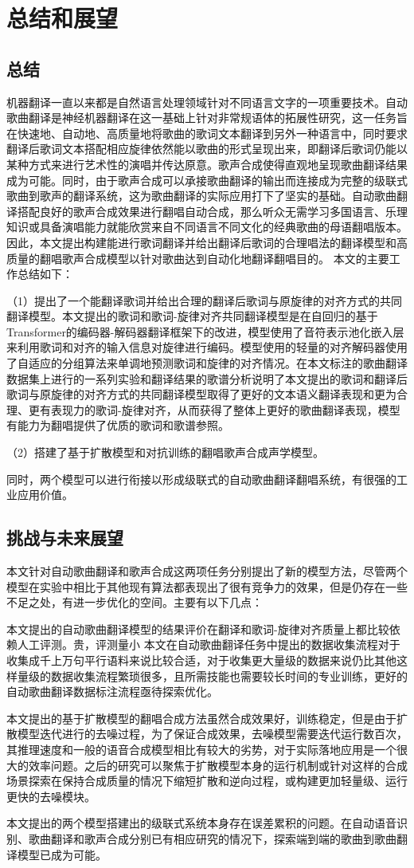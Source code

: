 



% 
\chapter{总结和展望}
\section{总结}
机器翻译一直以来都是自然语言处理领域针对不同语言文字的一项重要技术。自动歌曲翻译是神经机器翻译在这一基础上针对非常规语体的拓展性研究，这一任务旨在快速地、自动地、高质量地将歌曲的歌词文本翻译到另外一种语言中，同时要求翻译后歌词文本搭配相应旋律依然能以歌曲的形式呈现出来，即翻译后歌词仍能以某种方式来进行艺术性的演唱并传达原意。歌声合成使得直观地呈现歌曲翻译结果成为可能。同时，由于歌声合成可以承接歌曲翻译的输出而连接成为完整的级联式歌曲到歌声的翻译系统，这为歌曲翻译的实际应用打下了坚实的基础。自动歌曲翻译搭配良好的歌声合成效果进行翻唱自动合成，那么听众无需学习多国语言、乐理知识或具备演唱能力就能欣赏来自不同语言不同文化的经典歌曲的母语翻唱版本。
因此，本文提出构建能进行歌词翻译并给出翻译后歌词的合理唱法的翻译模型和高质量的翻唱歌声合成模型以针对歌曲达到自动化地翻译翻唱目的。
本文的主要工作总结如下：

（1）提出了一个能翻译歌词并给出合理的翻译后歌词与原旋律的对齐方式的共同翻译模型。本文提出的歌词和歌词-旋律对齐共同翻译模型是在自回归的基于Transformer的编码器-解码器翻译框架下的改进，模型使用了音符表示池化嵌入层来利用歌词和对齐的输入信息对旋律进行编码。模型使用的轻量的对齐解码器使用了自适应的分组算法来单调地预测歌词和旋律的对齐情况。在本文标注的歌曲翻译数据集上进行的一系列实验和翻译结果的歌谱分析说明了本文提出的歌词和翻译后歌词与原旋律的对齐方式的共同翻译模型取得了更好的文本语义翻译表现和更为合理、更有表现力的歌词-旋律对齐，从而获得了整体上更好的歌曲翻译表现，模型有能力为翻唱提供了优质的歌词和歌谱参照。

（2）搭建了基于扩散模型和对抗训练的翻唱歌声合成声学模型。

同时，两个模型可以进行衔接以形成级联式的自动歌曲翻译翻唱系统，有很强的工业应用价值。
\section{挑战与未来展望}
本文针对自动歌曲翻译和歌声合成这两项任务分别提出了新的模型方法，尽管两个模型在实验中相比于其他现有算法都表现出了很有竞争力的效果，但是仍存在一些不足之处，有进一步优化的空间。主要有以下几点：

本文提出的自动歌曲翻译模型的结果评价在翻译和歌词-旋律对齐质量上都比较依赖人工评测。贵，评测量小
本文在自动歌曲翻译任务中提出的数据收集流程对于收集成千上万句平行语料来说比较合适，对于收集更大量级的数据来说仍比其他这样量级的数据收集流程繁琐很多，且所需技能也需要较长时间的专业训练，更好的自动歌曲翻译数据标注流程亟待探索优化。

本文提出的基于扩散模型的翻唱合成方法虽然合成效果好，训练稳定，但是由于扩散模型迭代进行的去噪过程，为了保证合成效果，去噪模型需要迭代运行数百次，其推理速度和一般的语音合成模型相比有较大的劣势，对于实际落地应用是一个很大的效率问题。之后的研究可以聚焦于扩散模型本身的运行机制或针对这样的合成场景探索在保持合成质量的情况下缩短扩散和逆向过程，或构建更加轻量级、运行更快的去噪模块。

本文提出的两个模型搭建出的级联式系统本身存在误差累积的问题。在自动语音识别、歌曲翻译和歌声合成分别已有相应研究的情况下，探索端到端的歌曲到歌曲翻译模型已成为可能。
